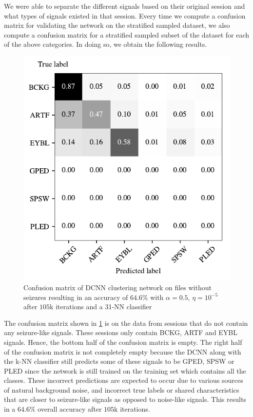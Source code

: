 We were able to separate the different signals based on their original session and what types of signals existed in that session. Every time we compute a confusion matrix for validating the network on the stratified sampled dataset, we also compute a confusion matrix for a stratified sampled subset of the dataset for each of the above categories. In doing so, we obtain the following results. 

\begin{figure}[!ht]
	\centering
	\includegraphics[width=0.7\linewidth]{pictures/conf_mat_exp_without_seizure.pdf}
	\caption[Confusion matrix on sessions without seizure-like signals]{Confusion matrix of DCNN clustering network on files without seizures resulting in an accuracy of $64.6\%$ with $\alpha = 0.5$, $\eta = 10^{-5}$ after $105$k iterations and a 31-NN classifier}\label{fig:conf_mat_exp_without_seizure}  
\end{figure}

The confusion matrix shown in \cref{fig:conf_mat_exp_without_seizure} is on the data from sessions that do not contain any seizure-like signals. These sessions only contain BCKG, ARTF and EYBL signals. Hence, the bottom half of the confusion matrix is empty. The right half of the confusion matrix is not completely empty because the DCNN along with the k-NN classifier still predicts some of these signals to be GPED, SPSW or PLED since the network is still trained on the training set which contains all the classes. These incorrect predictions are expected to occur due to various sources of natural background noise, and incorrect true labels or shared characteristics that are closer to seizure-like signals as opposed to noise-like signals. This results in a $64.6\%$ overall accuracy after $105$k iterations.

